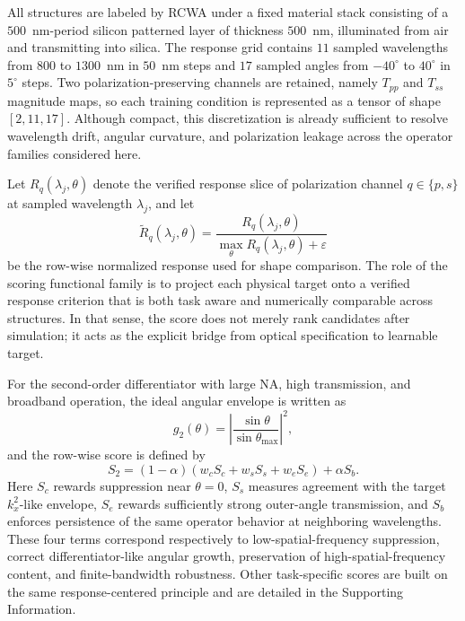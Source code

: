 All structures are labeled by RCWA under a fixed material stack consisting of a $500$~nm-period silicon patterned layer of thickness $500$~nm, illuminated from air and transmitting into silica. The response grid contains $11$ sampled wavelengths from $800$ to $1300$~nm in $50$~nm steps and $17$ sampled angles from $-40^{\circ}$ to $40^{\circ}$ in $5^{\circ}$ steps. Two polarization-preserving channels are retained, namely $T_{pp}$ and $T_{ss}$ magnitude maps, so each training condition is represented as a tensor of shape $[2,11,17]$. Although compact, this discretization is already sufficient to resolve wavelength drift, angular curvature, and polarization leakage across the operator families considered here.

Let $R_q(\lambda_j,\theta)$ denote the verified response slice of polarization channel $q\in\{p,s\}$ at sampled wavelength $\lambda_j$, and let
\begin{equation}
\widetilde{R}_q(\lambda_j,\theta)=\frac{R_q(\lambda_j,\theta)}{\max_{\theta}R_q(\lambda_j,\theta)+\varepsilon}
\end{equation}
be the row-wise normalized response used for shape comparison. The role of the scoring functional family is to project each physical target onto a verified response criterion that is both task aware and numerically comparable across structures. In that sense, the score does not merely rank candidates after simulation; it acts as the explicit bridge from optical specification to learnable target.

For the second-order differentiator with large NA, high transmission, and broadband operation, the ideal angular envelope is written as
\begin{equation}
g_2(\theta)=\left|\frac{\sin\theta}{\sin\theta_{\max}}\right|^{2},
\end{equation}
and the row-wise score is defined by
\begin{equation}
S_2=(1-\alpha)\left(w_c S_c+w_s S_s+w_e S_e\right)+\alpha S_b.
\end{equation}
Here $S_c$ rewards suppression near $\theta=0$, $S_s$ measures agreement with the target $k_x^2$-like envelope, $S_e$ rewards sufficiently strong outer-angle transmission, and $S_b$ enforces persistence of the same operator behavior at neighboring wavelengths. These four terms correspond respectively to low-spatial-frequency suppression, correct differentiator-like angular growth, preservation of high-spatial-frequency content, and finite-bandwidth robustness. Other task-specific scores are built on the same response-centered principle and are detailed in the Supporting Information.

